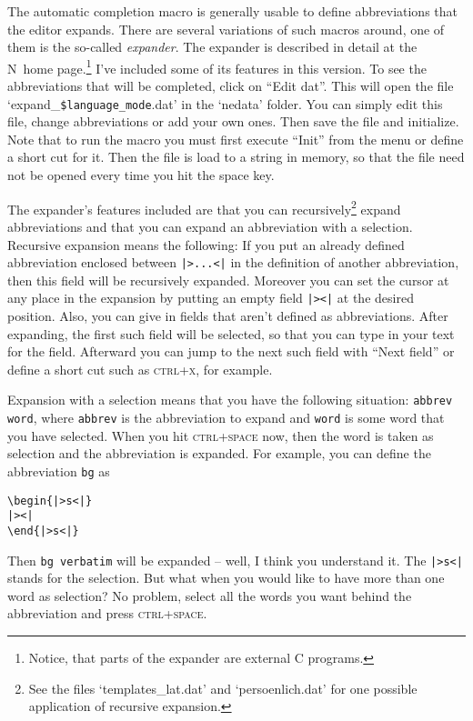 \documentclass{article}
\newcommand{\nedit}{N\kern-0.8pt{Edit}}
\newcommand{\keyname}[1]{\textsc{#1}}
\begin{document}
The automatic completion macro is generally usable to define abbreviations that the editor expands. There are several variations of such macros around, one of them is  the so-called \emph{expander}. The expander is described in detail at the \nedit\ home page.\footnote{Notice, that parts of the expander are external C programs.} 
I've included some of its features in this version.
To see the abbreviations that will be completed, click on ``Edit dat''. This will open the file `expand\_\verb|$language_mode|.dat' in the `nedata' folder. You can simply edit this file, change abbreviations or add your own ones. Then save the file and initialize. Note that to run the macro you must first execute ``Init'' from the menu or define a short cut for it. Then the file is load to a string in memory, so that the file need not be opened every time you hit the space key.

The expander's features included are that you can recursively\footnote{See the files `templates\_lat.dat' and `persoenlich.dat' for one possible application of recursive expansion.} expand abbreviations and that you can expand an abbreviation with a selection. 
Recursive expansion means the following: If you put an already defined abbreviation enclosed between \verb+|>...<|+ in the definition of another abbreviation, then this field will be recursively expanded. Moreover you can set the cursor at any place in the expansion by putting an empty field \verb+|><|+ at the desired position. Also, you can give in fields that aren't defined as abbreviations. After expanding, the first such field will be selected, so that you can type in your text for the field. Afterward you can jump to the next such field with ``Next field'' or define a short cut such as \keyname{ctrl+x}, for example.

Expansion with a selection means that you have the following situation:
\verb*|abbrev word|, where \verb|abbrev| is the abbreviation to expand and \verb|word| is some word that you have selected. When you hit \keyname{ctrl+space} now, then the word is taken as selection and the abbreviation  is expanded. For example, you can define the abbreviation \verb|bg| as%
\begin{verbatim}
\begin{|>s<|}
|><|
\end{|>s<|}
\end{verbatim}
\noindent Then \verb|bg verbatim| will be expanded -- well, I think you understand it. The \verb/|>s<|/ stands for the selection.
But what when you would like to have more than one word as selection? No problem, select all the words you want behind the abbreviation and press \keyname{ctrl+space}.
\end{document}
